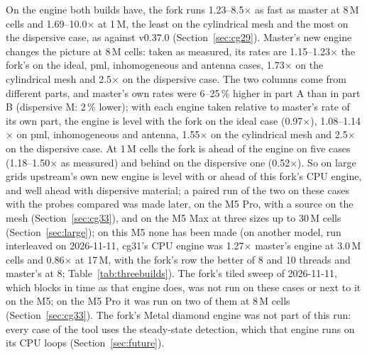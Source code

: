 On the engine both builds have, the fork runs 1.23--8.5$\times$ as fast as master at 8\,M cells and
1.69--10.0$\times$ at 1\,M, the least on the cylindrical mesh and the most on the dispersive case, as against v0.37.0
(Section~\ref{sec:cg29}). Master's new  engine changes the picture at 8\,M cells: taken as measured,
its rates are 1.15--1.23$\times$ the fork's on the ideal, pml, inhomogeneous and antenna cases, 1.73$\times$ on the
cylindrical mesh and 2.5$\times$ on the dispersive case. The two columns come from different parts, and master's own
 rates were 6--25\,\% higher in part A than in part B (dispersive M: 2\,\% lower); with each engine
taken relative to master's  rate of its own part, the  engine is level with the fork
on the ideal case (0.97$\times$), 1.08--1.14$\times$ on pml, inhomogeneous and antenna, 1.55$\times$ on the
cylindrical mesh and 2.5$\times$ on the dispersive case. At 1\,M cells the fork is ahead of the  engine on
five cases (1.18--1.50$\times$ as measured) and behind on the dispersive one (0.52$\times$). So on large grids
upstream's own new engine is level with or ahead of this fork's CPU engine, and well ahead with dispersive material;
a paired run of the two on these cases with the probes compared was made later, on the M5 Pro, with a source on the
mesh (Section~\ref{sec:cg33}), and on the M5 Max at three sizes up to 30\,M cells (Section~\ref{sec:large}); on this M5 none has been made (on another model, run
interleaved on 2026-11-11, cg31's CPU engine was 1.27$\times$ master's  engine at 3.0\,M cells and
0.86$\times$ at 17\,M, with the fork's row the better of 8 and 10 threads and master's at 8; Table~\ref{tab:threebuilds}). The fork's tiled sweep of 2026-11-11, which blocks in time as
that engine does, was not run on these cases or next to it on the M5; on the M5 Pro it was run on two of them at 8\,M cells
(Section~\ref{sec:cg33}). The fork's Metal diamond engine
was not part of
this run: every case of the tool uses the steady-state detection, which that engine runs on its CPU loops
(Section~\ref{sec:future}).

